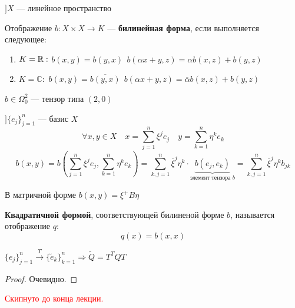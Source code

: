 $] X$ --- линейное пространство

\begin{definition}
    Отображение $b : X\times X \to K$ --- \textbf{билинейная форма}, если выполняется следующее:
    \begin{enumerate}
        \item $K=\mathbb{R}:$ $b(x, y) = b(y, x) \ \ b(\alpha x + y, z) = \alpha b(x, z) + b(y, z)$
        \item $K=\mathbb{C}:$ $b(x, y) = \overline{b(y, x)} \ \ b(\alpha x + y, z) = \overline\alpha b(x, z) + b(y, z)$
    \end{enumerate}
\end{definition}
\begin{remark}
    $b\in \Omega_0^2$ --- тензор типа $(2, 0)$
\end{remark}

$] \{e_j\}_{j=1}^n$ --- базис $X$
$$\forall x,y\in X \quad x=\sum_{j=1}^n \xi^j e_j \quad y = \sum_{k=1}^n \eta^k e_k$$
$$b(x, y) = b(\sum_{j=1}^n \xi^j e_j, \sum_{k=1}^n \eta^k e_k)=\sum_{k,j=1}^n \overline \xi^j \eta^k \cdot \underbrace{b(e_j, e_k)}_{\text{элемент тензора }b}=\sum_{k,j=1}^n \overline \xi^j \eta^k b_{jk}$$

\begin{remark}
    В матричной форме $b(x,y) = \xi^+ B \eta$
\end{remark}

\begin{definition}
    \textbf{Квадратичной формой}, соответствующей билиненой форме $b$, называется отображение $q$:
    $$q(x)=b(x, x)$$
\end{definition}

\begin{lemma}
    $\{e_j\}_{j=1}^n \xrightarrow{T} \{\tilde e_k\}_{k=1}^n \Rightarrow \tilde Q = T^T Q T$
\end{lemma}
\begin{proof}
    Очевидно.
\end{proof}

\textcolor{red}{Скипнуто до конца лекции.}

